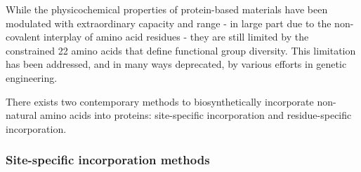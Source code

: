 \begin{refsection}
While the physicochemical properties of protein-based materials have been
modulated with extraordinary capacity and range - in large part due to
the non-covalent interplay of amino acid residues - they are still limited by
the constrained 22 amino acids that define functional group diversity.
This limitation has been addressed, and in many ways deprecated, by various
efforts in genetic engineering.

There exists two contemporary methods to biosynthetically incorporate
non-natural amino acids into proteins: site-specific incorporation and
residue-specific incorporation.

\subsubsection{Site-specific incorporation methods} 



\end{refsection}

